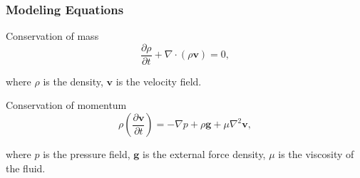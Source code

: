\documentclass[aspectratio=169]{beamer}
\begin{document}
\begin{frame}
\frametitle{Modeling Equations}
\begin{block}{Conservation of mass}
\[
\frac{\partial \rho}{\partial t}+\nabla\cdot\left(\rho\mathbf{v}\right)=0,
\]
\end{block}
where \(\rho\) is the density, \(\mathbf{v}\) is the velocity field.
\begin{block}{Conservation of momentum}
\[
\rho\left(\frac{\partial \mathbf{v}}{\partial t}\right) = -\nabla p + \rho \mathbf{g} + \mu \nabla^2 \mathbf{v},
\]
\end{block}
where \(p\) is the pressure field, \(\mathbf{g}\) is the external force density, \(\mu\) is the viscosity of the fluid.
\end{frame}
\end{document}
